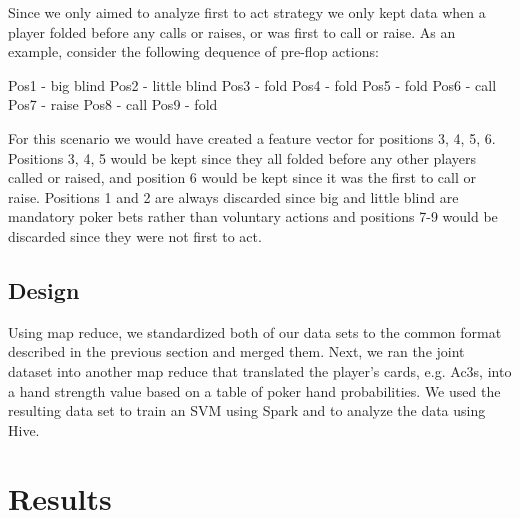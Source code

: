 \documentclass[twoside]{article}
\begin{document}
\begin{multicols}{2}
Since we only aimed to analyze first to act strategy we only kept data when a player folded before any calls or raises, or was first to call or raise. As an example, consider the following dequence of pre-flop actions: \newline

Pos1 - big blind\newline
\indent Pos2 - little blind\newline
\indent Pos3 - fold\newline
\indent Pos4 - fold\newline
\indent Pos5 - fold\newline
\indent Pos6 - call\newline
\indent Pos7 - raise\newline
\indent Pos8 - call\newline
\indent Pos9 - fold\newline

For this scenario we would have created a feature vector for positions 3, 4, 5, 6. Positions 3, 4, 5 would be kept since they all folded before any other players called or raised, and position 6 would be kept since it was the first to call or raise. 
Positions 1 and 2 are always discarded since big and little blind are mandatory poker bets rather than voluntary actions and positions 7-9 would be discarded since they were not first to act. 

\subsection{Design}
Using map reduce, we standardized both of our data sets to the common format described in the previous section and merged them. Next, we ran the joint dataset into another map reduce that translated the player's cards, e.g. Ac3s, into a hand strength value based on a table of poker hand probabilities. We used the resulting data set to train an SVM using Spark and to analyze the data using Hive. 



\section{Results}


\end{multicols}
\end{document}
